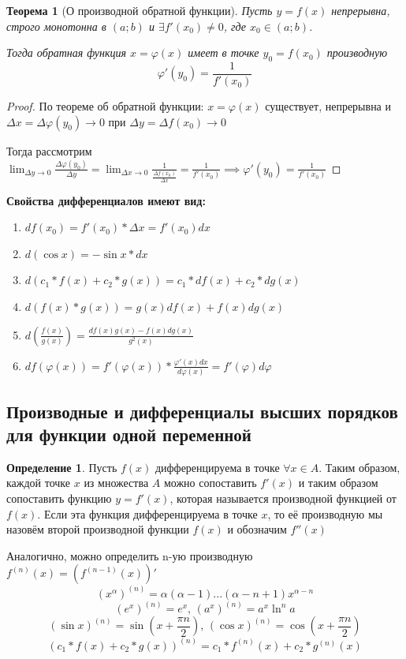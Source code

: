 \documentclass[a4paper,oneside]{article}
\newcommand{\dslim}{\displaystyle\lim}
\newcommand{\approach}[1]{\underset{#1}{\longrightarrow}}
\newtheorem{theorem}{Теорема}[subsection]
\theoremstyle{definition}
\newtheorem{definition}{Определение}[subsection]
\theoremstyle{definition}
\theoremstyle{definition}
\begin{document}
\begin{theorem}[О производной обратной функции]
    Пусть $y = f(x)$ непрерывна, строго монотонна в $(a; b)$ и
    $\exists f'(x_0) \ne 0$, где $x_0 \in (a; b)$.

    Тогда обратная функция $x = \varphi (x)$ имеет в точке $y_0 = f(x_0)$ производную
    \[ \varphi' (y_0) = \frac{1}{f'(x_0)} \]
\end{theorem}
\begin{proof}
    По теореме об обратной функции: $x= \varphi (x)$ существует, непрерывна и
    $\Delta x = \Delta \varphi (y_0) \approach{} 0$ при $\Delta y = \Delta f(x_0) \approach{} 0$

    Тогда рассмотрим $\dslim_{\Delta y \to 0} \frac{\Delta \varphi (y_0)}{\Delta y} =
    \dslim_{\Delta x \to 0} \frac{1}{\frac{\Delta f(x_0)}{\Delta x}} = \frac{1}{f'(x_0)}
    \implies \varphi'(y_0) = \frac{1}{f'(x_0)}$
\end{proof}




\textbf{Свойства дифференциалов имеют вид:}
\begin{enumerate}
    \item $df(x_0) = f'(x_0)*\Delta x = f'(x_0)dx$
    \item $d(\cos x) = -\sin x * dx$
    \item $d(c_1*f(x) + c_2*g(x)) = c_1*df(x) + c_2*dg(x)$
    \item $d(f(x)*g(x)) = g(x)df(x) + f(x)dg(x)$
    \item $d(\frac{f(x)}{g(x)}) = \frac{df(x)g(x) - f(x)dg(x)}{g^2(x)}$
    \item $df(\varphi(x)) = f'(\varphi(x)) * \frac{\varphi'(x)dx}{d\varphi(x)} = f'(\varphi)d\varphi$
\end{enumerate}


\subsection{Производные и дифференциалы высших порядков для функции одной переменной}
\begin{definition}
    Пусть $f(x)$ дифференцируема в точке $\forall x \in A$. Таким образом, каждой точке $x$ из множества $A$ можно
    сопоставить $f'(x)$ и таким образом сопоставить функцию $y = f'(x)$, которая называется производной функцией от $f(x)$.
    Если эта функция дифференцируема в точке $x$, то её производную мы назовём второй производной функции $f(x)$ и обозначим $f''(x)$
    
    Аналогично, можно определить n-ую производную $f^{(n)}(x) = (f^{(n-1)}(x))'$
    \[(x^\alpha)^{(n)} = \alpha(\alpha-1)...(\alpha-n+1)x^{\alpha-n}\]
    \[(e^x)^{(n)} = e^x, \, (a^x)^{(n)} = a^x \ln^n a\]
    \[(\sin x)^{(n)} = \sin(x+\frac{\pi n}{2}), \, (\cos x)^{(n)} = \cos (x + \frac{\pi n}{2})\]
    \[(c_1*f(x) + c_2*g(x))^{(n)} = c_1*f^{(n)}(x) + c_2*g^{(n)}(x)\]
\end{definition}
\end{document}
